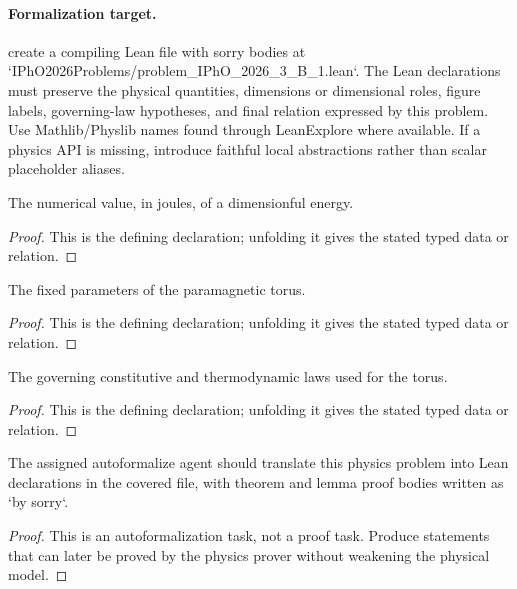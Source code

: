 \paragraph{Formalization target.}
create a compiling Lean file with sorry bodies at `IPhO2026Problems/problem\_IPhO\_2026\_3\_B\_1.lean`. The Lean declarations must preserve the physical quantities, dimensions or dimensional roles, figure labels, governing-law hypotheses, and final relation expressed by this problem.
Use Mathlib/Physlib names found through LeanExplore where available. If a physics API is missing, introduce faithful local abstractions rather than scalar placeholder aliases.

\begin{definition}[energyInJoules]
  \label{decl:physics:IPhO_2026_3_B_1:energyInJoules}
  The numerical value, in joules, of a dimensionful energy.
\end{definition}
\begin{proof}
  This is the defining declaration; unfolding it gives the stated typed data or relation.
\end{proof}

\begin{definition}[ParamagneticTorus]
  \label{decl:physics:IPhO_2026_3_B_1:ParamagneticTorus}
  The fixed parameters of the paramagnetic torus.
\end{definition}
\begin{proof}
  This is the defining declaration; unfolding it gives the stated typed data or relation.
\end{proof}

\begin{definition}[ParamagneticTorusLaws]
  \label{decl:physics:IPhO_2026_3_B_1:ParamagneticTorusLaws}
  The governing constitutive and thermodynamic laws used for the torus.
\end{definition}
\begin{proof}
  This is the defining declaration; unfolding it gives the stated typed data or relation.
\end{proof}

\begin{theorem}
\label{thm:physics:IPhO_2026_3_B_1:target}
The assigned autoformalize agent should translate this physics problem into Lean declarations in the covered file, with theorem and lemma proof bodies written as `by sorry`.
\end{theorem}
\begin{proof}
This is an autoformalization task, not a proof task. Produce statements that can later be proved by the physics prover without weakening the physical model.
\end{proof}
